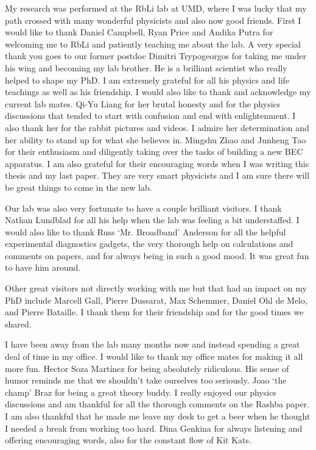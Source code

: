 My research was performed at the RbLi lab at UMD, where I was lucky that my path crossed with many wonderful physicists and also now good friends. First I would like to thank  Daniel Campbell, Ryan Price and Andika Putra for welcoming me to RbLi and patiently teaching me about the lab. A very special thank you goes to our former postdoc Dimitri Trypogeorgos for taking me under his wing and becoming my lab brother. He is a brilliant scientist who really helped to shape my PhD. I am extremely grateful for all his physics and life teachings as well as his friendship. I would also like to thank and acknowledge my current lab mates. Qi-Yu Liang for her brutal honesty and for the physics discussions that tended to start with confusion and end with enlightenment. I also thank her for the rabbit pictures and videos. I admire her determination and her ability to stand up for what she believes in. Mingshu Zhao and Junheng Tao for their enthusiasm and diligently taking over the tasks of building a new BEC apparatus. I am also grateful for their encouraging words when I was writing this thesis and my last paper. They are very smart physicists and I am sure there will be great things to come in the new lab. 

Our lab was also very fortunate to have a couple brilliant visitors. I thank Nathan Lundblad for all his help when the lab was feeling a bit understaffed. I would also like to thank Russ `Mr. Broadband' Anderson for all the helpful experimental diagnostics gadgets, the very thorough help on calculations and comments on papers, and for always being in such a good mood. It was great fun to have him around. 

Other great visitors not directly working with me but that had an impact on my PhD include Marcell Gall, Pierre Dussarat, Max Schemmer, Daniel Ohl de Melo, and Pierre Bataille. I thank them for their friendship and for the good times we shared.  

I have been away from the lab many months now and instead spending a great deal of time in my office. I would like to thank my office mates for making it all more fun. Hector Soza Mart\'inez for being absolutely ridiculous. His sense of humor reminds me that we shouldn't take ourselves too seriously. Joao `the champ' Braz for being a great theory buddy. I really enjoyed our physics discussions and am thankful for all the thorough comments on the Rashba paper. I am also thankful that he made me leave my desk to get a beer when he thought I needed a break from working too hard. Dina Genkina for always listening and offering encouraging words, also for the constant flow of Kit Kats. 

